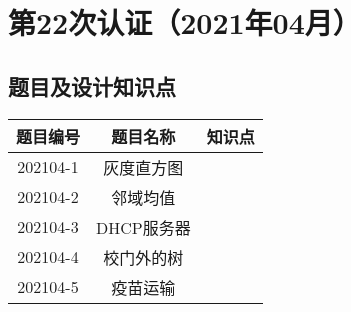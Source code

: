 \documentclass[cn,10pt,math=newtx,citestyle=gb7714-2015,bibstyle=gb7714-2015]{elegantbook}
\begin{document}


% 

% 

% 

% 

% 



% 

% 

% 

% 

% 


\chapter{第22次认证（2021年04月）}

\section{题目及设计知识点}

\begin{table}[htbp]
  \centering
  \begin{tabular}{ccc}
    \toprule
    题目编号 & 题目名称   & 知识点 \\
    \midrule
    202104-1 & 灰度直方图 &        \\
    202104-2 & 邻域均值   &        \\
    202104-3 & DHCP服务器 &        \\
    202104-4 & 校门外的树 &        \\
    202104-5 & 疫苗运输   &        \\
    \bottomrule
  \end{tabular}
\end{table}
\end{document}
